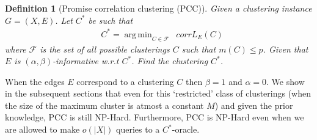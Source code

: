 \documentclass[12pt]{article}
\newtheorem{definition}[theorem]{Definition}
\newcommand{\mc}{\mathcal}
\DeclareMathOperator*{\argmin}{arg\,min}
\begin{document}
\begin{definition}[Promise correlation clustering (PCC)]
\label{defn:promiseCorrClustering}
Given a clustering instance $G = (X, E)$. Let $C^*$ be such that
\begin{align}
  &C^* = \argmin_{C \in \mc F} \enspace corrL_{E}(C) \label{eqn:promiseCorrLoss}
\end{align}
where $\mc F$ is the set of all possible clusterings $C$ such that $m(C) \le p$. Given that $E$ is $(\alpha, \beta)$-informative w.r.t $C^*$. Find the clustering $C^*$. 
\end{definition}
When the edges $E$ correspond to a clustering $C$ then $\beta = 1$ and $\alpha = 0$. We show in the subsequent sections that even for this `restricted' class of clusterings (when the size of the maximum cluster is atmost a constant $M$) and given the prior knowledge, PCC is still NP-Hard. Furthermore, PCC is NP-Hard even when we are allowed to make $o(|X|)$ queries to a $C^*$-oracle. 
\end{document}
